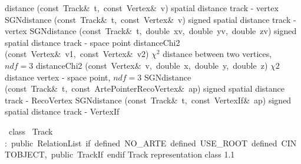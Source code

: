 \documentclass{article}
\begin{document}
\begin{cxxentry}
\begin{cxxnames}
\label{cxx.1.16}
        {distance}
        {(const\ Track\&\ t,\ const\ Vertex\&\ v)}
        { spatial distance track - vertex}
        {}
\label{cxx.1.17}
        {SGNdistance}
        {(const\ Track\&\ t,\ const\ Vertex\&\ v)}
        { signed spatial distance track - vertex}
        {}
\label{cxx.1.18}
        {SGNdistance}
        {(const\ Track\&\ t,\ double\ xv,\ double\ yv,\ double\ zv)}
        { signed spatial distance track - space point}
        {}
\label{cxx.1.19}
        {distanceChi2}
        {(const\ Vertex\&\ v1,\ const\ Vertex\&\ v2)}
        { $\chi^2$ distance between two vertices, $ndf = 3$}
        {}
\label{cxx.1.20}
        {distanceChi2}
        {(const\ Vertex\&\ v,\ double\ x,\ double\ y,\ double\ z)}
        { $\chi2$ distance vertex - space point, $ndf = 3$}
        {}
\label{cxx.1.21}
        {SGNdistance}
        {(const\ Track\&\ t,\ const\ ArtePointer\<RecoVertex\>\&\ ap)}
        { signed spatial distance track - RecoVertex}
        {}
\label{cxx.1.22}
        {SGNdistance}
        {(const\ Track\&\ t,\ const\ VertexIf\&\ ap)}
        { signed spatial distance track - VertexIf}
        {}
\label{cxx.1.23}
\end{cxxnames}
\begin{cxxclass}
{\ class\ }
        {Track}
        {:\ public\ RelationList\ if\ defined\ NO\_ARTE\ defined\ USE\_ROOT\ defined\ CINTOBJECT,\ public\ TrackIf\ endif}
        {Track representation class}
        {1.1}
\begin{cxxInheritance}

\end{cxxInheritance}
\end{cxxclass}
\end{cxxentry}
\end{document}
